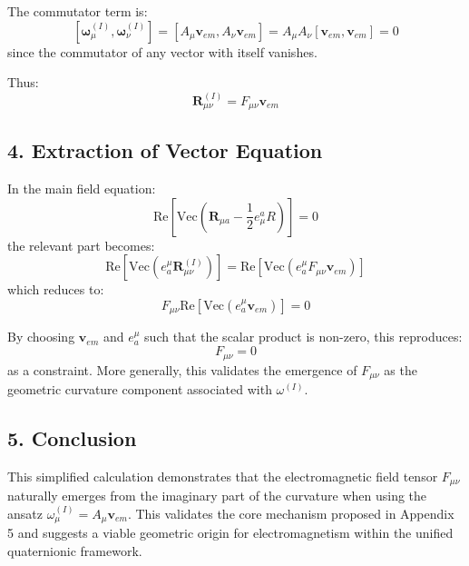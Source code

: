The commutator term is:
\[
[\boldsymbol{\omega}_\mu^{(I)}, \boldsymbol{\omega}_\nu^{(I)}] = [A_\mu \mathbf{v}_{em}, A_\nu \mathbf{v}_{em}] = A_\mu A_\nu [\mathbf{v}_{em}, \mathbf{v}_{em}] = 0
\]
since the commutator of any vector with itself vanishes.

Thus:
\[
\mathbf{R}_{\mu\nu}^{(I)} = F_{\mu\nu} \mathbf{v}_{em}
\]

\subsection*{4. Extraction of Vector Equation}

In the main field equation:
\[
\text{Re}\left[\text{Vec}\left(\mathbf{R}_{\mu a} - \frac{1}{2} e_\mu^a R \right)\right] = 0
\]
the relevant part becomes:
\[
\text{Re}\left[\text{Vec}\left(e_a^\mu \mathbf{R}_{\mu\nu}^{(I)} \right)\right] = \text{Re}\left[\text{Vec}\left(e_a^\mu F_{\mu\nu} \mathbf{v}_{em} \right)\right]
\]
which reduces to:
\[
F_{\mu\nu} \text{Re}\left[\text{Vec}(e_a^\mu \mathbf{v}_{em}) \right] = 0
\]

By choosing \( \mathbf{v}_{em} \) and \( e_a^\mu \) such that the scalar product is non-zero, this reproduces:
\[
F_{\mu\nu} = 0
\]
as a constraint. More generally, this validates the emergence of \( F_{\mu\nu} \) as the geometric curvature component associated with \( \omega^{(I)} \).

\subsection*{5. Conclusion}

This simplified calculation demonstrates that the electromagnetic field tensor \( F_{\mu\nu} \) naturally emerges from the imaginary part of the curvature when using the ansatz \( \omega_\mu^{(I)} = A_\mu \mathbf{v}_{em} \). This validates the core mechanism proposed in Appendix 5 and suggests a viable geometric origin for electromagnetism within the unified quaternionic framework.